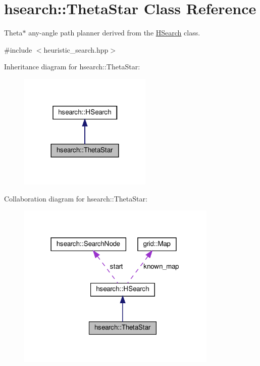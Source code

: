 \hypertarget{classhsearch_1_1ThetaStar}{}\section{hsearch\+:\+:Theta\+Star Class Reference}
\label{classhsearch_1_1ThetaStar}


Theta$\ast$ any-\/angle path planner derived from the \hyperlink{classhsearch_1_1HSearch}{H\+Search} class.  




{\ttfamily \#include $<$heuristic\+\_\+search.\+hpp$>$}



Inheritance diagram for hsearch\+:\+:Theta\+Star\+:\nopagebreak
\begin{figure}[H]
\begin{center}
\leavevmode
\includegraphics[width=180pt]{d9/db2/classhsearch_1_1ThetaStar__inherit__graph}
\end{center}
\end{figure}


Collaboration diagram for hsearch\+:\+:Theta\+Star\+:\nopagebreak
\begin{figure}[H]
\begin{center}
\leavevmode
\includegraphics[width=271pt]{da/d4f/classhsearch_1_1ThetaStar__coll__graph}
\end{center}
\end{figure}
